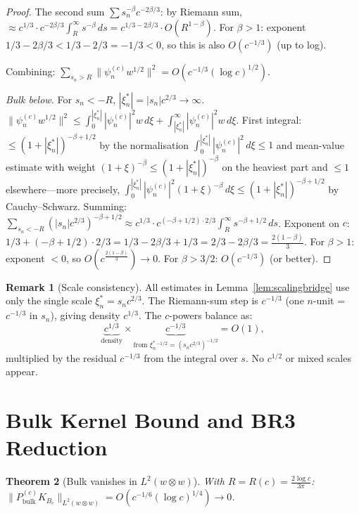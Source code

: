 \documentclass[12pt,a4paper]{amsart}
\newtheorem{theorem}{Theorem}[section]
\theoremstyle{definition}
\newtheorem{remark}[theorem]{Remark}
\newcommand{\Sbulk}{P_{\mathrm{bulk}}^{(c)}}
\newcommand{\cK}{K_{B_c}}
\newcommand{\xin}{\xi_n^*}
\begin{document}
\begin{proof}
The second sum $\sum s_n^{-\beta}c^{-2\beta/3}$:
by Riemann sum, $\approx c^{1/3}\cdot c^{-2\beta/3}\int_R^\infty s^{-\beta}\,ds
= c^{1/3-2\beta/3}\cdot O(R^{1-\beta})$.
For $\beta>1$: exponent $1/3-2\beta/3 < 1/3-2/3 = -1/3 <0$,
so this is also $O(c^{-1/3})$ (up to log).

Combining: $\sum_{s_n>R}\|\psi_n^{(c)}w^{1/2}\|^2 = O(c^{-1/3}(\log c)^{1/2})$.

\smallskip\emph{Bulk below.}
For $s_n<-R$, $|\xin|=|s_n|c^{2/3}\to\infty$.
$\|\psi_n^{(c)}w^{1/2}\|^2
\leq \int_0^{|\xin|}|\psi_n^{(c)}|^2 w\,d\xi
+ \int_{|\xin|}^\infty|\psi_n^{(c)}|^2 w\,d\xi$.
First integral:
$\leq (1+|\xin|)^{-\beta+1/2}$ by the normalisation $\int_0^{|\xin|}|\psi_n^{(c)}|^2\,d\xi\leq 1$
and mean-value estimate with weight $(1+\xi)^{-\beta}\leq(1+|\xin|)^{-\beta}$
on the heaviest part and $\leq 1$ elsewhere---more precisely,
$\int_0^{|\xin|}|\psi_n^{(c)}|^2(1+\xi)^{-\beta}\,d\xi
\leq (1+|\xin|)^{-\beta+1/2}$ by Cauchy--Schwarz.
Summing: $\sum_{s_n<-R}(|s_n|c^{2/3})^{-\beta+1/2}
\approx c^{1/3}\cdot c^{(-\beta+1/2)\cdot 2/3}\int_R^\infty s^{-\beta+1/2}\,ds$.
Exponent on $c$: $1/3+(-\beta+1/2)\cdot 2/3 = 1/3-2\beta/3+1/3 = 2/3-2\beta/3
= \frac{2(1-\beta)}{3}$.
For $\beta>1$: exponent $< 0$, so $O(c^{\frac{2(1-\beta)}{3}})\to 0$.
For $\beta>3/2$: $O(c^{-1/3})$ (or better).
\end{proof}

\begin{remark}[Scale consistency]
\label{rem:scaleconsist}
All estimates in Lemma~\ref{lem:scalingbridge} use
only the single scale $\xin = s_n c^{2/3}$.
The Riemann-sum step is $c^{-1/3}$ (one $n$-unit = $c^{-1/3}$ in $s_n$),
giving density $c^{1/3}$.
The $c$-powers balance as:
\[
\underbrace{c^{1/3}}_{\text{density}}
\times
\underbrace{c^{-1/3}}_{\text{from }\xin^{-1/2}=(s_n c^{2/3})^{-1/2}}
= O(1),
\]
multiplied by the residual $c^{-1/3}$ from the integral over $s$.
No $c^{1/2}$ or mixed scales appear.
\end{remark}

\section{Bulk Kernel Bound and BR3 Reduction}
\label{sec:br3}

\begin{theorem}[Bulk vanishes in $L^2(w\otimes w)$]
\label{thm:bulk}
With $R=R(c)=\frac{2\log c}{3\pi}$:
$\|\Sbulk\cK\|_{L^2(w\otimes w)} = O(c^{-1/6}(\log c)^{1/4})\to 0$.
\end{theorem}
\end{document}
